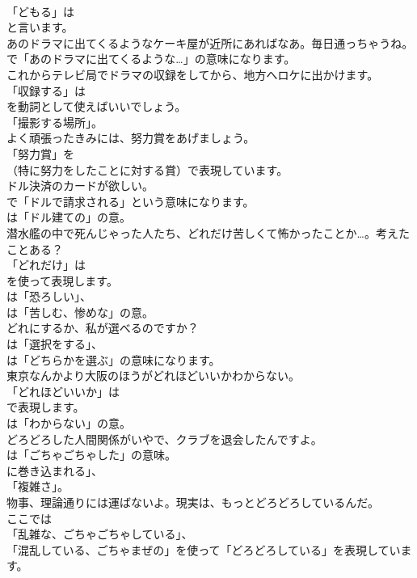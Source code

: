 \documentclass[8pt]{extreport}
\begin{document}
\begin{CJK}{UTF8}{min}
\\	「どもる」は
\\	と言います。	
\\	あのドラマに出てくるようなケーキ屋が近所にあればなあ。毎日通っちゃうね。 
\\	で「あのドラマに出てくるような…」の意味になります。	
\\	これからテレビ局でドラマの収録をしてから、地方へロケに出かけます。 
\\	「収録する」は
\\	を動詞として使えばいいでしょう。
\\	「撮影する場所」。	
\\	よく頑張ったきみには、努力賞をあげましょう。 
\\	「努力賞」を
\\	（特に努力をしたことに対する賞）で表現しています。	
\\	ドル決済のカードが欲しい。 
\\	で「ドルで請求される」という意味になります。
\\	は「ドル建ての」の意。	
\\	潜水艦の中で死んじゃった人たち、どれだけ苦しくて怖かったことか…。考えたことある？ 
\\	「どれだけ」は 
\\	を使って表現します。
\\	は「恐ろしい」、
\\	は「苦しむ、惨めな」の意。	
\\	どれにするか、私が選べるのですか？ 
\\	は「選択をする」、
\\	は「どちらかを選ぶ」の意味になります。	
\\	東京なんかより大阪のほうがどれほどいいかわからない。 
\\	「どれほどいいか」は 
\\	で表現します。
\\	は「わからない」の意。	
\\	どろどろした人間関係がいやで、クラブを退会したんですよ。 
\\	は「ごちゃごちゃした」の意味。
\\	に巻き込まれる」、
\\	「複雑さ」。	
\\	物事、理論通りには運ばないよ。現実は、もっとどろどろしているんだ。 
\\	ここでは
\\	「乱雑な、ごちゃごちゃしている」、
\\	「混乱している、ごちゃまぜの」を使って「どろどろしている」を表現しています。	

\end{CJK}
\end{document}
